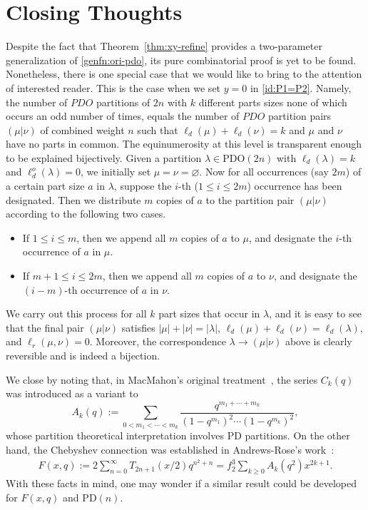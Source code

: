 \documentclass[11pt,reqno]{amsart}
\numberwithin{equation}{section}
\theoremstyle{plain}
\theoremstyle{definition}
\theoremstyle{named}
\def\PD{\mathrm{PD}}
\def\PDO{\mathrm{PDO}}
\begin{document}
\section{Closing Thoughts}

Despite the fact that Theorem~\ref{thm:xy-refine}  provides a two-parameter generalization of \eqref{genfn:ori-pdo}, its pure combinatorial proof is yet to be found. Nonetheless, there is one special case that we would like to bring to the attention of interested reader. This is the case when we set $y=0$ in \eqref{id:P1=P2}. Namely, the number of $PDO$ partitions of $2n$ with $k$ different parts sizes none of which occurs an odd number of times, equals the number of $PDO$ partition pairs $(\mu | \nu)$ of combined weight $n$ such that $\ell_d(\mu)+\ell_d(\nu)=k$ and $\mu$ and $\nu$ have no parts in common. The equinumerosity at this level is transparent enough to be explained bijectively. Given a partition $\lambda\in\PDO(2n)$ with $\ell_d(\lambda)=k$ and $\ell_d^{o}(\lambda)=0$, we initially set $\mu=\nu=\varnothing$. Now for all occurrences (say $2m$) of a certain part size $a$ in $\lambda$, suppose the $i$-th ($1\le i\le 2m$) occurrence has been designated. Then we distribute $m$ copies of $a$ to the partition pair $(\mu |\nu)$ according to the following two cases.
\begin{itemize}
    \item If $1\le i\le m$, then we append all $m$ copies of $a$ to $\mu$, and designate the $i$-th occurrence of $a$ in $\mu$.
    \item If $m+1\le i\le 2m$, then we append all $m$ copies of $a$ to $\nu$, and designate the $(i-m)$-th occurrence of $a$ in $\nu$.
\end{itemize}
We carry out this process for all $k$ part sizes that occur in $\lambda$, and it is easy to see that the final pair $(\mu |\nu)$ satisfies $|\mu|+|\nu|=|\lambda|$, $\ell_d(\mu)+\ell_d(\nu)=\ell_d(\lambda)$, and $\ell_r(\mu,\nu)=0$. Moreover, the correspondence $\lambda\to(\mu |\nu)$ above is clearly reversible and is indeed a bijection. 

We close by noting that, in MacMahon's original treatment~\cite{Mac}, the series $C_k(q)$ was introduced as a variant to
\begin{equation*}
A_k(q):=\sum_{0<m_1<\cdots<m_k}\frac{q^{m_1+\cdots+m_k}}{(1-q^{m_1})^2\cdots(1-q^{m_k})^2},
\end{equation*}
whose partition theoretical interpretation involves $\PD$ partitions. On the other hand, the Chebyshev connection was established in Andrews-Rose's work~\cite{AR13}:
\begin{align}
\label{id:F-A}
F(x,q):=2\sum_{n=0}^{\infty}T_{2n+1}(x/2)q^{n^2+n}=f_2^3\sum_{k\ge 0}A_k(q^2)x^{2k+1}.
\end{align}
With these facts in mind, one may wonder if a similar result could be developed for $F(x,q)$ and $\PD(n)$. 
\end{document}
